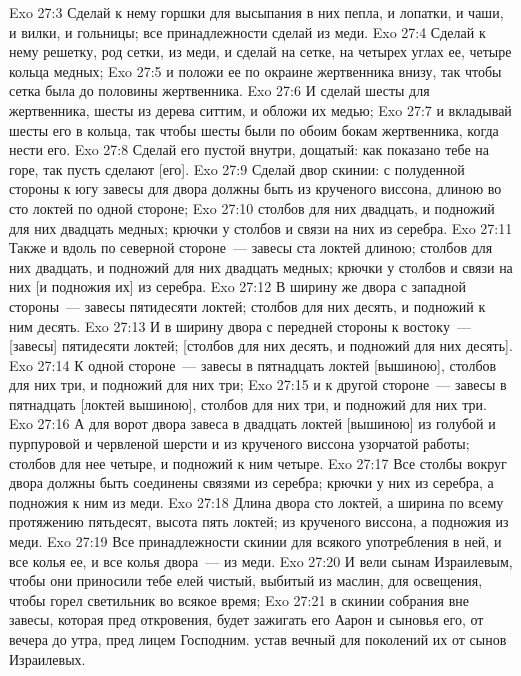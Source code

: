 \vs Exo 27:3 Сделай к нему горшки для высыпания в них пепла, и лопатки, и чаши, и вилки, и гольницы; все принадлежности сделай из меди.
\vs Exo 27:4 Сделай к нему решетку, род сетки, из меди, и сделай на сетке, на четырех углах ее, четыре кольца медных;
\vs Exo 27:5 и положи ее по окраине жертвенника внизу, так чтобы сетка была до половины жертвенника.
\vs Exo 27:6 И сделай шесты для жертвенника, шесты из дерева ситтим, и обложи их медью;
\vs Exo 27:7 и вкладывай шесты его в кольца, так чтобы шесты были по обоим бокам жертвенника, когда нести его.
\vs Exo 27:8 Сделай его пустой внутри, дощатый: как показано тебе на горе, так пусть сделают [его].
\rsbpar\vs Exo 27:9 Сделай двор скинии: с полуденной стороны к югу завесы для двора должны быть из крученого виссона, длиною во сто локтей по одной стороне;
\vs Exo 27:10 столбов для них двадцать, и подножий для них двадцать медных; крючки у столбов и связи на них из серебра.
\vs Exo 27:11 Также и вдоль по северной стороне~--- завесы ста локтей длиною; столбов для них двадцать, и подножий для них двадцать медных; крючки у столбов и связи на них [и подножия их] из серебра.
\vs Exo 27:12 В ширину же двора с западной стороны~--- завесы пятидесяти локтей; столбов для них десять, и подножий к ним десять.
\vs Exo 27:13 И в ширину двора с передней стороны к востоку~--- [завесы] пятидесяти локтей; [столбов для них десять, и подножий для них десять].
\vs Exo 27:14 К одной стороне~--- завесы в пятнадцать локтей [вышиною], столбов для них три, и подножий для них три;
\vs Exo 27:15 и к другой стороне~--- завесы в пятнадцать [локтей вышиною], столбов для них три, и подножий для них три.
\vs Exo 27:16 А для ворот двора завеса в двадцать локтей [вышиною] из голубой и пурпуровой и червленой шерсти и из крученого виссона узорчатой работы; столбов для нее четыре, и подножий к ним четыре.
\vs Exo 27:17 Все столбы вокруг двора должны быть соединены связями из серебра; крючки у них из серебра, а подножия к ним из меди.
\vs Exo 27:18 Длина двора сто локтей, а ширина по всему протяжению пятьдесят, высота пять локтей;  из крученого виссона, а подножия  из меди.
\vs Exo 27:19 Все принадлежности скинии для всякого употребления в ней, и все колья ее, и все колья двора~--- из меди.
\rsbpar\vs Exo 27:20 И вели сынам Израилевым, чтобы они приносили тебе елей чистый, выбитый из маслин, для освещения, чтобы горел светильник во всякое время;
\vs Exo 27:21 в скинии собрания вне завесы, которая пред  откровения, будет зажигать его Аарон и сыновья его, от вечера до утра, пред лицем Господним.  устав вечный для поколений их от сынов Израилевых.
